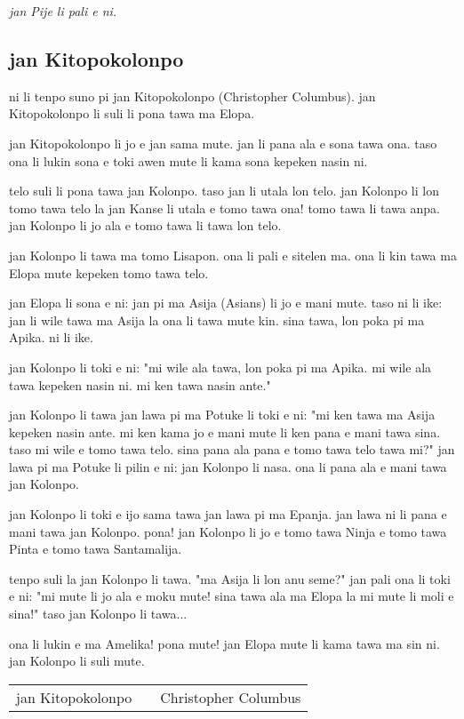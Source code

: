 \textit{jan Pije li pali e ni. \cite{www:Pije:01}}
%
\newpage
\subsection{jan Kitopokolonpo}

ni li tenpo suno pi jan Kitopokolonpo (Christopher Columbus). 
jan Kitopokolonpo li suli li pona tawa ma Elopa.

jan Kitopokolonpo li jo e jan sama mute. 
jan li pana ala e sona tawa ona. 
taso ona li lukin sona e toki awen mute li kama sona kepeken nasin ni.

telo suli li pona tawa jan Kolonpo. 
taso jan li utala lon telo. 
jan Kolonpo li lon tomo tawa telo la jan Kanse li utala e tomo tawa ona!
tomo tawa li tawa anpa. jan Kolonpo li jo ala e tomo tawa li tawa lon
telo.

jan Kolonpo li tawa ma tomo Lisapon. ona li pali e sitelen ma. ona li
kin tawa ma Elopa mute kepeken tomo tawa telo.

jan Elopa li sona e ni: jan pi ma Asija (Asians) li jo e mani mute.
taso ni li ike: jan li wile tawa ma Asija la ona li tawa mute kin.
sina tawa, lon poka pi ma Apika. ni li ike.

jan Kolonpo li toki e ni: "mi wile ala tawa, lon poka pi ma Apika. mi
wile ala tawa kepeken nasin ni. mi ken tawa nasin ante."

jan Kolonpo li tawa jan lawa pi ma Potuke li toki e ni: "mi ken tawa
ma Asija kepeken nasin ante. mi ken kama jo e mani mute li ken pana e
mani tawa sina. taso mi wile e tomo tawa telo. sina pana ala pana e
tomo tawa telo tawa mi?" jan lawa pi ma Potuke li pilin e ni: jan
Kolonpo li nasa. ona li pana ala e mani tawa jan Kolonpo.

jan Kolonpo li toki e ijo sama tawa jan lawa pi ma Epanja. jan lawa
ni li pana e mani tawa jan Kolonpo. pona! jan Kolonpo li jo e tomo
tawa Ninja e tomo tawa Pinta e tomo tawa Santamalija.

tenpo suli la jan Kolonpo li tawa. "ma Asija li lon anu seme?" jan
pali ona li toki e ni: "mi mute li jo ala e moku mute! sina tawa ala
ma Elopa la mi mute li moli e sina!" taso jan Kolonpo li tawa...

ona li lukin e ma Amelika! pona mute! jan Elopa mute li kama tawa ma
sin ni. jan Kolonpo li suli mute.

\begin{supertabular}{p{5,5cm}|ll}
jan Kitopokolonpo && Christopher Columbus \\
\end{supertabular}


